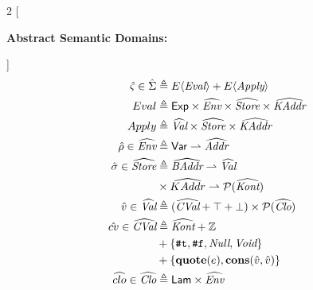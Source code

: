 \documentclass[12pt,draft]{article}
\newcommand{\truesyn}{\texttt{\#t}}
\newcommand{\falsesyn}{\texttt{\#f}}
\begin{document}
\begin{multicols*}{2}
  [
  \begin{center}
    \textbf{Abstract Semantic Domains:}
  \end{center}
  \vspace{-15mm}
  ]
  \begin{align*}
    \vspace{-10mm}
    \hat{\varsigma} \in \hat{\Sigma}
    &\triangleq E\langle \textit{Eval} \rangle + E\langle \textit{Apply} \rangle\\
    Eval &\triangleq \textsf{Exp}
           \times \widehat{\textit{Env}}
           \times \widehat{\textit{Store}}
           \times \widehat{\textit{KAddr}} \\
    Apply &\triangleq \widehat{\textit{Val}}
            \times \widehat{\textit{Store}} \times \widehat{\textit{KAddr}} \\
    \aenv \in \widehat{\textit{Env}}
    &\triangleq \textsf{Var} \rightharpoonup \widehat{\textit{Addr}} \\
    \astore \in \widehat{\textit{Store}}
    &\triangleq \widehat{\textit{BAddr}} \rightharpoonup \widehat{\textit{Val}} \\
    &\times \widehat{KAddr} \rightharpoonup \mathcal{P}(\widehat{\textit{Kont}}) \\
    \aval \in \widehat{\textit{Val}} &\triangleq
                                       (\widehat{\textit{CVal}} + \top + \bot)
                                       \times \mathcal{P}(\widehat{\textit{Clo}}) \\
    \hat{cv} \in \widehat{\textit{CVal}}
    &\triangleq \widehat{\textit{Kont}} + \mathbb{Z} \\
    &+ \{\truesyn , \falsesyn , \textit{Null} , \textit{Void}\} \\
    &+ \{\textbf{quote}(e) , \textbf{cons}(\aval, \aval)\} \\
    \aclo \in \widehat{\textit{Clo}}
    &\triangleq \textsf{Lam} \times \widehat{\textit{Env}} \\

\end{align*}
\end{multicols*}
\end{document}
